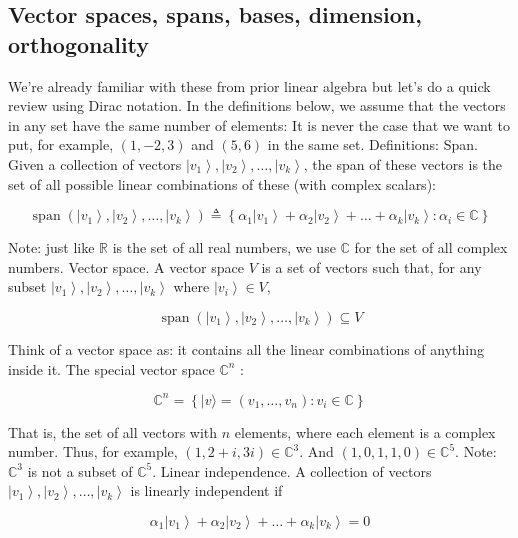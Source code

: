 \documentclass[main.tex]{subfiles}
\begin{document}
\subsection{Vector spaces, spans, bases, dimension, orthogonality}

    We're already familiar with these from prior linear algebra but let's do a quick review using Dirac notation. In the definitions below, we assume that the vectors in any set have the same number of elements: It is never the case that we want to put, for example, $(1,-2,3)$ and $(5,6)$ in the same set.
    Definitions: Span. Given a collection of vectors $\left|v_{1}\right\rangle,\left|v_{2}\right\rangle, \ldots,\left|v_{k}\right\rangle$, the span of these vectors is the set of all possible linear combinations of these (with complex scalars):
    
    $$
    \operatorname{span}\left(\left|v_{1}\right\rangle,\left|v_{2}\right\rangle, \ldots,\left|v_{k}\right\rangle\right) \triangleq\left\{\alpha_{1}\left|v_{1}\right\rangle+\alpha_{2}\left|v_{2}\right\rangle+\ldots+\alpha_{k}\left|v_{k}\right\rangle: \alpha_{i} \in \mathbb{C}\right\}
    $$
    
    Note: just like $\mathbb{R}$ is the set of all real numbers, we use $\mathbb{C}$ for the set of all complex numbers. Vector space. A vector space $V$ is a set of vectors such that, for any subset $\left|v_{1}\right\rangle,\left|v_{2}\right\rangle, \ldots,\left|v_{k}\right\rangle$ where $\left|v_{i}\right\rangle \in V$,
    
    $$
    \operatorname{span}\left(\left|v_{1}\right\rangle,\left|v_{2}\right\rangle, \ldots,\left|v_{k}\right\rangle\right) \subseteq V
    $$
    
    Think of a vector space as: it contains all the linear combinations of anything inside it. The special vector space $\mathbb{C}^{n}$ :
    
    $$
    \mathbb{C}^{n}=\left\{|v\rangle=\left(v_{1}, \ldots, v_{n}\right): v_{i} \in \mathbb{C}\right\}
    $$
    
    That is, the set of all vectors with $n$ elements, where each element is a complex number. Thus, for example, $(1,2+i, 3 i) \in \mathbb{C}^{3}$. And $(1,0,1,1,0) \in \mathbb{C}^{5}$. Note: $\mathbb{C}^{3}$ is not a subset of $\mathbb{C}^{5}$. Linear independence. A collection of vectors $\left|v_{1}\right\rangle,\left|v_{2}\right\rangle, \ldots,\left|v_{k}\right\rangle$ is linearly independent if
    
    $$
    \alpha_{1}\left|v_{1}\right\rangle+\alpha_{2}\left|v_{2}\right\rangle+\ldots+\alpha_{k}\left|v_{k}\right\rangle=0
    $$
    
\end{document}
